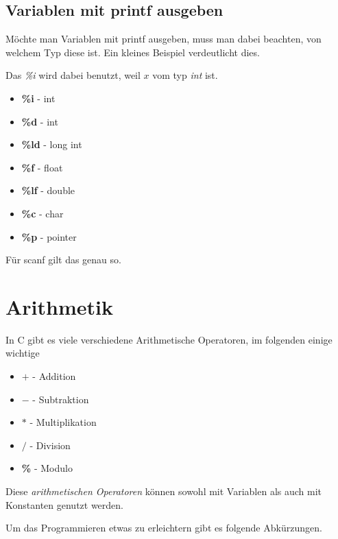 \documentclass[c_worksheet.tex]{subfiles}
\begin{document}
\subsection{Variablen mit printf ausgeben} 

Möchte man Variablen mit printf ausgeben, muss man dabei beachten, von welchem Typ diese ist. Ein kleines Beispiel verdeutlicht dies.



Das \emph{\%i} wird dabei benutzt, weil \(x\) vom typ \emph{int} ist.

\begin{itemize}
	\item \textbf{\%i} - int
	\item \textbf{\%d} - int
	\item \textbf{\%ld} - long int
	\item \textbf{\%f} - float
	\item \textbf{\%lf} - double
	\item \textbf{\%c} - char
	\item \textbf{\%p} - pointer 
\end{itemize}

Für scanf gilt das genau so.

\section{Arithmetik}

In C gibt es viele verschiedene Arithmetische Operatoren, im folgenden einige wichtige

\begin{itemize}
 	\item \textbf{\(+\)} - Addition
 	\item \textbf{\(-\)} - Subtraktion
 	\item \textbf{\(*\)} - Multiplikation
 	\item \textbf{\(/\)} - Division
 	\item \textbf{\%} - Modulo   
 \end{itemize} 

 Diese \emph{arithmetischen Operatoren} können sowohl mit Variablen als auch mit Konstanten genutzt werden.

  

Um das Programmieren etwas zu erleichtern gibt es folgende Abkürzungen.

 
\end{document}
